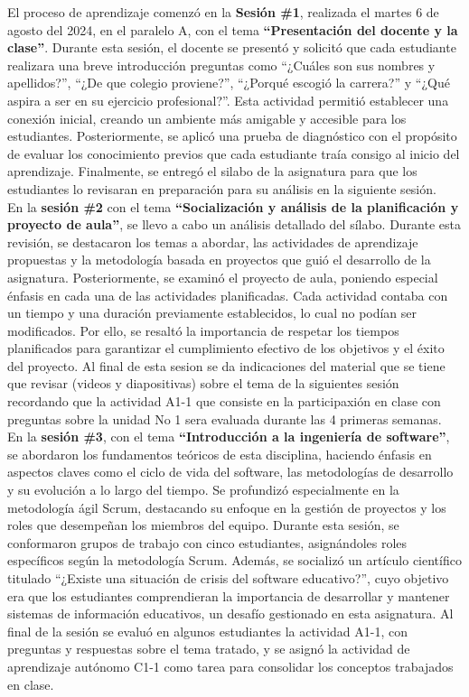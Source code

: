 \documentclass[12pt]{article}
\begin{document}
\begin{multicols}{2}

El proceso de aprendizaje comenzó  en la  \textbf{Sesión \#1}, realizada el martes 6 de agosto del 2024, en el paralelo A, con el tema \textbf{``Presentación del docente y la clase''}. Durante esta sesión, el docente se presentó y solicitó que cada estudiante realizara una breve introducción preguntas como ``¿Cuáles son sus nombres y apellidos?'', ``¿De que colegio proviene?'', ``¿Porqué escogió la carrera?'' y ``¿Qué aspira a ser en su ejercicio profesional?''. Esta actividad permitió establecer una conexión inicial, creando un ambiente más amigable y accesible para los estudiantes. Posteriormente, se aplicó una prueba de diagnóstico con el propósito de evaluar los conocimiento previos que cada estudiante traía consigo al inicio del aprendizaje. Finalmente, se entregó el silabo de la asignatura para que los estudiantes lo revisaran en preparación para su análisis en la siguiente sesión. \\
En la \textbf{sesión \#2} con el tema \textbf{``Socialización y análisis de la planificación y proyecto de aula''}, se llevo a cabo un análisis detallado del sílabo. Durante esta revisión, se destacaron los temas a abordar, las actividades de aprendizaje propuestas y la metodología basada en proyectos que guió el desarrollo de la asignatura. Posteriormente, se examinó el proyecto de aula, poniendo especial énfasis en cada una de las actividades planificadas. Cada actividad contaba con un tiempo y una duración previamente establecidos, lo cual no podían ser modificados. Por ello, se resaltó la importancia de respetar los tiempos planificados para garantizar el cumplimiento efectivo de los objetivos y el éxito del proyecto. Al final de esta sesion se da indicaciones del material que se tiene que revisar (videos y diapositivas) sobre el tema de la siguientes  sesión recordando que la actividad A1-1 que consiste en la participaxión en clase con preguntas sobre la unidad No 1 sera evaluada durante las 4 primeras semanas.\\
En la \textbf{sesión \#3}, con el tema \textbf{``Introducción a la ingeniería de software''}, se abordaron los fundamentos teóricos de esta disciplina, haciendo énfasis en aspectos claves como el ciclo de vida del software, las metodologías de desarrollo y su evolución  a lo largo del tiempo. Se profundizó especialmente en la metodología ágil Scrum, destacando su enfoque en la gestión de proyectos y los roles que desempeñan los miembros del equipo. Durante esta sesión, se conformaron grupos de trabajo con cinco estudiantes, asignándoles roles específicos según la metodología Scrum. Además, se socializó un artículo científico titulado ``¿Existe una situación de crisis del software educativo?'', cuyo objetivo era que los estudiantes comprendieran la importancia de desarrollar y mantener sistemas de información educativos, un desafío gestionado en esta asignatura. Al final de la sesión se evaluó en algunos estudiantes la actividad A1-1, con preguntas y respuestas sobre el tema tratado, y se asignó la actividad de aprendizaje autónomo C1-1 como tarea para consolidar los conceptos trabajados en clase.  \\

\end{multicols}
\end{document}
